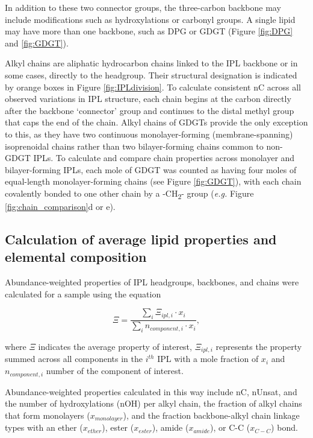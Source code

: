 In addition to these two connector groups, the three-carbon backbone may include modifications such as hydroxylations or carbonyl groups. A single lipid may have more than one backbone, such as DPG or GDGT (Figure \ref{fig:DPG} and \ref{fig:GDGT}). 

Alkyl chains are aliphatic hydrocarbon chains linked to the IPL backbone or in some cases, directly to the headgroup. Their structural designation is indicated by orange boxes in Figure \ref{fig:IPLdivision}. To calculate consistent nC across all observed variations in IPL structure, each chain begins at the carbon directly after the backbone `connector' group and continues to the distal methyl group that caps the end of the chain. Alkyl chains of GDGTs provide the only exception to this, as they have two continuous monolayer-forming (membrane-spanning) isoprenoidal chains rather than two bilayer-forming chains common to non-GDGT IPLs. To calculate and compare chain properties across monolayer and bilayer-forming IPLs, each mole of GDGT was counted as having four moles of equal-length monolayer-forming chains (see Figure \ref{fig:GDGT}), with each chain covalently bonded to one other chain by a -CH\textsubscript{2}- group (\textit{e.g.} Figure \ref{fig:chain_comparison}d or e).





\subsection{Calculation of average lipid properties and elemental composition}
Abundance-weighted properties of IPL headgroups, backbones, and chains were calculated for a sample using the equation

\begin{equation} \label{eq:avecomponent}
\Xi = \frac{\sum_{i} \Xi_{ipl,i} \cdot x_{i}}{\sum_{i} n_{component,i} \cdot x_{i}},
\end{equation}

\noindent where $\Xi$ indicates the average property of interest, $\Xi_{ipl,i}$ represents the property summed across all components in the $i^{th}$ IPL with a mole fraction of $x_{i}$ and $n_{component,i}$ number of the component of interest.

Abundance-weighted properties calculated in this way include nC, nUnsat, and the number of hydroxylations (nOH) per alkyl chain, the fraction of alkyl chains that form monolayers ($x_{monolayer}$), and the fraction backbone-alkyl chain linkage types with an ether ($x_{ether}$), ester ($x_{ester}$), amide ($x_{amide}$), or C-C ($x_{C-C}$) bond.

